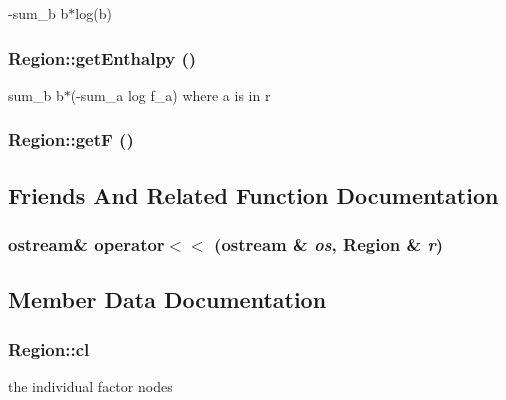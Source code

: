 -sum\_\-b b$\ast$log(b) 

\subsubsection{ Region::getEnthalpy ()}\label{classRegion_0251def2aa02034901b428f6677cc189}


sum\_\-b b$\ast$(-sum\_\-a log f\_\-a) where a is in r 

\subsubsection{ Region::getF ()\hspace{0.3cm}{\tt  [inline]}}\label{classRegion_6eca271abe95dd05213eccb28eb9946f}




\subsection{Friends And Related Function Documentation}
\subsubsection{\setlength{\rightskip}{0pt plus 5cm}ostream\& operator$<$$<$ (ostream \& {\em os}, {\bf Region} \& {\em r})\hspace{0.3cm}{\tt  [friend]}}\label{classRegion_dae0ea77403cfc7bb79908cd822e9594}




\subsection{Member Data Documentation}
\subsubsection{ {\bf Region::cl}\hspace{0.3cm}{\tt  [private]}}\label{classRegion_3182ec08261913cefdc346e7ffafd87e}


the individual factor nodes 

